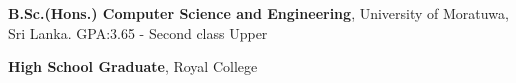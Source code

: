 
\vspace*{0.2cm}
\begin{scholarship}
					{\textbf{B.Sc.(Hons.) Computer Science and Engineering}, University of Moratuwa, Sri Lanka. GPA:3.65 - Second class Upper}
				
					{\textbf{High School Graduate}, Royal College}

	
\end{scholarship}